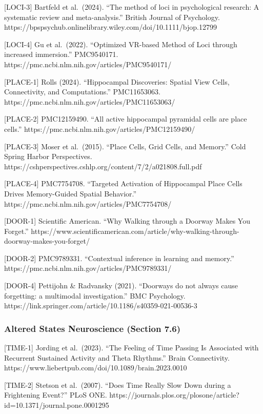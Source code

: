 \documentclass[
]{article}
\begin{document}
{[}LOCI-3{]} Bartfeld et al.~(2024). ``The method of loci in
psychological research: A systematic review and meta-analysis.'' British
Journal of Psychology.
https://bpspsychub.onlinelibrary.wiley.com/doi/10.1111/bjop.12799

{[}LOCI-4{]} Gu et al.~(2022). ``Optimized VR-based Method of Loci
through increased immersion.'' PMC9540171.
https://pmc.ncbi.nlm.nih.gov/articles/PMC9540171/

{[}PLACE-1{]} Rolls (2024). ``Hippocampal Discoveries: Spatial View
Cells, Connectivity, and Computations.'' PMC11653063.
https://pmc.ncbi.nlm.nih.gov/articles/PMC11653063/

{[}PLACE-2{]} PMC12159490. ``All active hippocampal pyramidal cells are
place cells.'' https://pmc.ncbi.nlm.nih.gov/articles/PMC12159490/

{[}PLACE-3{]} Moser et al.~(2015). ``Place Cells, Grid Cells, and
Memory.'' Cold Spring Harbor Perspectives.
https://cshperspectives.cshlp.org/content/7/2/a021808.full.pdf

{[}PLACE-4{]} PMC7754708. ``Targeted Activation of Hippocampal Place
Cells Drives Memory-Guided Spatial Behavior.''
https://pmc.ncbi.nlm.nih.gov/articles/PMC7754708/

{[}DOOR-1{]} Scientific American. ``Why Walking through a Doorway Makes
You Forget.''
https://www.scientificamerican.com/article/why-walking-through-doorway-makes-you-forget/

{[}DOOR-2{]} PMC9789331. ``Contextual inference in learning and
memory.'' https://pmc.ncbi.nlm.nih.gov/articles/PMC9789331/

{[}DOOR-4{]} Pettijohn \& Radvansky (2021). ``Doorways do not always
cause forgetting: a multimodal investigation.'' BMC Psychology.
https://link.springer.com/article/10.1186/s40359-021-00536-3

\hypertarget{altered-states-neuroscience-section-7.6}{%
\subsubsection{Altered States Neuroscience (Section
7.6)}\label{altered-states-neuroscience-section-7.6}}

{[}TIME-1{]} Jording et al.~(2023). ``The Feeling of Time Passing Is
Associated with Recurrent Sustained Activity and Theta Rhythms.'' Brain
Connectivity. https://www.liebertpub.com/doi/10.1089/brain.2023.0010

{[}TIME-2{]} Stetson et al.~(2007). ``Does Time Really Slow Down during
a Frightening Event?'' PLoS ONE.
https://journals.plos.org/plosone/article?id=10.1371/journal.pone.0001295
\end{document}
